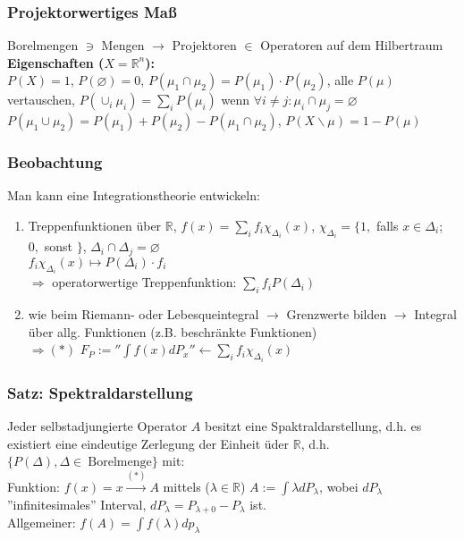 \documentclass[twoside,a4paper]{scrartcl}
\newcommand{\R}{\mathbb{R}}
\renewcommand{\1}{\mathds{1}}
\newcommand{\Ra}{\Rightarrow}
\newcommand{\ra}{\rightarrow}
\newcommand{\la}{\leftarrow}
\renewcommand{\R}{\mathbb{R}}
\begin{document}
\subsubsection*{Projektorwertiges Maß}
Borelmengen $\ni$ Mengen $\ra$ Projektoren $\in$ Operatoren auf dem Hilbertraum\\
\textbf{Eigenschaften ($X=\R^n$):}\\
$P(X)=1$, $P(\varnothing)=0$, $P(\mu_1 \cap \mu_2)=P(\mu_1)\cdot P(\mu_2)$, alle $P(\mu)$ vertauschen, $P(\cup_i \mu_i)=\sum_i P(\mu_i)$ wenn $\forall i\neq j: \mu_i \cap \mu_j=\varnothing$\\
$P(\mu_1 \cup \mu_2)=P(\mu_1)+ P(\mu_2)-P(\mu_1 \cap \mu_2)$, $P(X\backslash \mu)=1-P(\mu)$
\subsubsection*{Beobachtung}
Man kann eine Integrationstheorie entwickeln:

\begin{enumerate}
\item Treppenfunktionen über $\R$, $f(x)=\sum_i f_i\chi_{\Delta_i}(x)$, $\chi_{\Delta_i}=\{1, $ falls  $x\in \Delta_i$; $0,$ sonst $\}$, $\Delta_i \cap \Delta_j=\varnothing$\\
$f_i\chi_{\Delta_i}(x) \mapsto P(\Delta_i)\cdot f_i$\\
$\Ra$ operatorwertige Treppenfunktion: $\sum_i f_i P(\Delta_i)$
\item wie beim Riemann- oder Lebesqueintegral $\ra$ Grenzwerte bilden $\ra$ Integral über allg. Funktionen (z.B. beschränkte Funktionen)\\
$\Ra (*)$ $F_P:=''\int f(x)dP_x'' \la \sum_i f_i \chi_{\Delta_i}(x)$ 
\end{enumerate}

\subsubsection*{Satz: Spektraldarstellung}
Jeder selbstadjungierte Operator $A$ besitzt eine Spaktraldarstellung, d.h. es existiert eine eindeutige Zerlegung der Einheit üder $\R$, d.h. $\{P(\Delta), \Delta \in \ \mathrm{Borelmenge}\}$ mit:\\
Funktion: $f(x)=x \stackrel{(*)}{\ra} A$ mittels ($\lambda \in \R$) $A:=\int \lambda dP_\lambda$, wobei $dP_\lambda$ ''infinitesimales'' Interval, $dP_\lambda=P_{\lambda+0}-P_{\lambda}$ ist.\\
Allgemeiner: $f(A)=\int f(\lambda) dp_\lambda$
\end{document}
